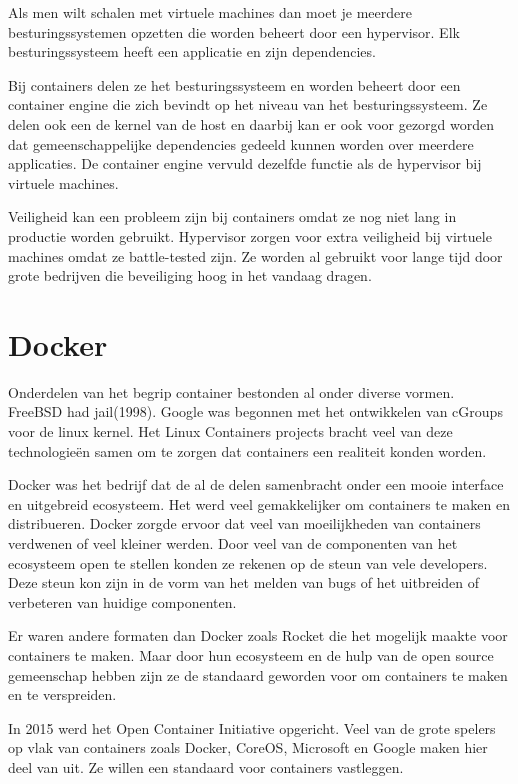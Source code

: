\documentclass[pdftex,a4paper,12pt,twoside]{report}
\begin{document}
Als men wilt schalen met virtuele machines dan moet je meerdere besturingssystemen opzetten die worden beheert door een hypervisor. Elk besturingssysteem heeft een applicatie en zijn dependencies.

Bij containers delen ze het besturingssysteem en worden beheert door een container engine die zich bevindt op het niveau van het besturingssysteem. Ze delen ook een de kernel van de host en daarbij kan er ook voor gezorgd worden dat gemeenschappelijke dependencies gedeeld kunnen worden over meerdere applicaties. De container engine vervuld dezelfde functie als de hypervisor bij virtuele machines. 

Veiligheid kan een probleem zijn bij containers omdat ze nog niet lang in productie worden gebruikt. Hypervisor zorgen voor extra veiligheid bij virtuele machines omdat ze battle-tested zijn. Ze worden al gebruikt voor lange tijd door grote bedrijven die beveiliging hoog in het vandaag dragen.

\section{Docker}

Onderdelen van het begrip container bestonden al onder diverse vormen. FreeBSD had jail(1998). Google was begonnen met het ontwikkelen van cGroups voor de linux kernel. Het Linux Containers projects bracht veel van deze technologieën samen om te zorgen dat containers een realiteit konden worden.

Docker was het bedrijf dat de al de delen samenbracht onder een mooie interface en uitgebreid ecosysteem. Het werd veel gemakkelijker om containers te maken en distribueren. Docker zorgde ervoor dat veel van moeilijkheden van containers verdwenen of veel kleiner werden. Door veel van de componenten van het ecosysteem open te stellen konden ze rekenen op de steun van vele developers. Deze steun kon zijn in de vorm van het melden van bugs of het uitbreiden of verbeteren van huidige componenten. 

Er waren andere formaten dan Docker zoals Rocket die het mogelijk maakte voor containers te maken. Maar door hun ecosysteem en de hulp van de open source gemeenschap hebben zijn ze de standaard geworden voor om containers te maken en te verspreiden.

In 2015 werd het Open Container Initiative opgericht. Veel van de grote spelers op vlak van containers zoals Docker, CoreOS, Microsoft en Google maken hier deel van uit. Ze willen een standaard voor containers vastleggen.
\end{document}
